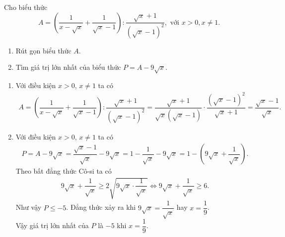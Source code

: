 \begin{ex}%
	Cho biểu thức
	$$A=\left(\dfrac{1}{x-\sqrt{x}}+\dfrac{1}{\sqrt{x}-1}\right):\dfrac{\sqrt{x}+1}{\left(\sqrt{x}-1\right)^2}, \text{ với } x>0, x\neq 1.$$
	\begin{enumerate}
		\item Rút gọn biểu thức $A$.
		\item Tìm giá trị lớn nhất của biểu thức $P=A-9\sqrt{x}$.
	\end{enumerate}
	\loigiai
	{
		\begin{enumerate}
			\item Với điều kiện $x>0$, $x\neq 1$ ta có
			\begin{eqnarray*}
			 A = \left(\dfrac{1}{x-\sqrt{x}}+\dfrac{1}{\sqrt{x}-1}\right) : \dfrac{\sqrt{x}+1}{\left(\sqrt{x}-1\right)^2} = \dfrac{\sqrt{x}+1}{\sqrt{x}\left(\sqrt{x}-1\right)} \cdot \dfrac{\left(\sqrt{x}-1\right)^2}{\sqrt{x}+1} = \dfrac{\sqrt{x}-1}{\sqrt{x}}.
			\end{eqnarray*}
			\item Với điều kiện $x>0$, $x\neq 1$ ta có
			\begin{eqnarray*}
			 P = A-9\sqrt{x}=\dfrac{\sqrt{x}-1}{\sqrt{x}}-9\sqrt{x}=1-\dfrac{1}{\sqrt{x}}-9\sqrt{x}  = 1-\left(9\sqrt{x}+\dfrac{1}{\sqrt{x}}\right).
			\end{eqnarray*}
			Theo bất đẳng thức Cô-si ta có
			\begin{eqnarray*}
			 9\sqrt{x}+\dfrac{1}{\sqrt{x}} \geq 2\sqrt{9\sqrt{x}\cdot\dfrac{1}{\sqrt{x}}} \Leftrightarrow 9\sqrt{x}+\dfrac{1}{\sqrt{x}} \geq 6.
			\end{eqnarray*}
			Như vậy $P \leq -5$. Đẳng thức xảy ra khi $9\sqrt{x}=\dfrac{1}{\sqrt{x}}$ hay $x=\dfrac{1}{9}$.\\
			Vậy giá trị lớn nhất của $P$ là $-5$ khi $x=\dfrac{1}{9}$.
		\end{enumerate}
	}
\end{ex}

